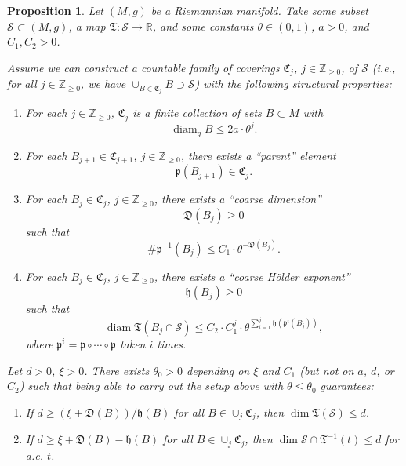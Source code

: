 \documentclass[11pt, letterpaper, reqno]{amsart}
\numberwithin{equation}{section}
\newtheorem{Prop}[Def]{Proposition}
\theoremstyle{remark}
\newcommand{\RR}{\mathbb{R}}
\newcommand{\ZZ}{\mathbb{Z}}
\newcommand{\cS}{\mathcal{S}}
\newcommand{\frT}{\mathfrak{T}}
\begin{document}
\begin{Prop} \label{prop:covering}
	Let $(M, g)$ be a Riemannian manifold. Take some subset $\cS \subset (M, g)$, a map $\frT : \cS \to \RR$, and some constants $\theta \in (0, 1)$, $a > 0$, and $C_1, C_2 > 0$. 
	
	Assume we can construct a countable family of coverings $\mathfrak{C}_j$, $j \in \ZZ_{\geq 0}$, of $\cS$ (i.e., for all $j \in \ZZ_{\geq 0}$, we have $\cup_{B \in \mathfrak{C}_j} B \supset \cS$) with the following structural properties:
	\begin{enumerate}
		\item[(1)] For each $j \in \ZZ_{\geq 0}$, $\mathfrak{C}_j$ is a finite collection of sets $B \subset M$ with
			\[ \operatorname{diam}_g B \leq 2 a \cdot \theta^j. \]
		\item[(2)] For each $B_{j+1} \in \mathfrak{C}_{j+1}$, $j \in \ZZ_{\geq 0}$, there exists a ``parent'' element
			\[ \mathfrak{p}(B_{j+1}) \in \mathfrak{C}_j. \]
		\item[(3)] For each $B_j \in \mathfrak{C}_j$, $j \in \ZZ_{\geq 0}$, there exists a ``coarse dimension''
			\[ \mathfrak{D}(B_j) \geq 0 \]
			such that
			\[ \# \mathfrak{p}^{-1}(B_j) \leq C_1 \cdot \theta^{-\mathfrak{D}(B_j)}. \]
		\item[(4)] For each $B_j \in \mathfrak{C}_j$, $j \in \ZZ_{\geq 0}$, there exists a ``coarse H\"older exponent''
			\[ \mathfrak{h}(B_j) \geq 0 \]
			such that
			\[ \operatorname{diam} \frT(B_j \cap \cS) \leq C_2 \cdot C_1^j \cdot \theta^{\sum_{i=1}^j \mathfrak{h}(\mathfrak{p}^i(B_j))}, \]
			where $\mathfrak{p}^i = \mathfrak{p} \circ \cdots \circ \mathfrak{p}$ taken $i$ times.
	\end{enumerate}
	Let $d > 0$, $\xi > 0$. There exists $\theta_0 > 0$ depending on $\xi$ and $C_1$ (but not on $a$, $d$, or $C_2$) such that being able to carry out the setup above with $\theta \leq \theta_0$ guarantees:
	\begin{enumerate}
		\item[(i)] If $d \geq (\xi + \mathfrak{D}(B))/\mathfrak{h}(B)$ for all $B \in \cup_j \mathfrak{C}_j$, then $\dim \frT(\cS) \leq d$.
		\item[(ii)] If $d \geq \xi + \mathfrak{D}(B) - \mathfrak{h}(B)$ for all $B \in \cup_j \mathfrak{C}_j$, then $\dim \cS \cap \frT^{-1}(t) \leq d$ for a.e. $t$.
	\end{enumerate}
\end{Prop}
\end{document}
